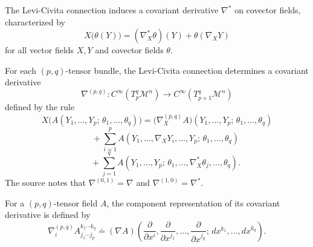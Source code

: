 \begin{definition}
\label{appa-def-covariant-derivative-covector}



The Levi-Civita connection induces a covariant derivative \(\nabla^*\) on covector fields, characterized by
\[
X\bigl(\theta(Y)\bigr) = (\nabla_X^*\theta)(Y) + \theta(\nabla_X Y)
\]
for all vector fields \(X,Y\) and covector fields \(\theta\).
\end{definition}

\begin{definition}
\label{appa-def-covariant-derivative-general-tensor}



For each \((p,q)\)-tensor bundle, the Levi-Civita connection determines a covariant derivative
\[
\nabla^{(p,q)} : C^\infty\!\left(T_p^q \mathcal M^n\right) \to C^\infty\!\left(T_{p+1}^q \mathcal M^n\right)
\]
defined by the rule
\[
X\bigl(A(Y_1,\ldots,Y_p;\,\theta_1,\ldots,\theta_q)\bigr)
= \bigl(\nabla_X^{(p,q)}A\bigr)(Y_1,\ldots,Y_p;\,\theta_1,\ldots,\theta_q)
\]
\[
\qquad + \sum_{i=1}^p A(Y_1,\ldots,\nabla_X Y_i,\ldots,Y_p;\,\theta_1,\ldots,\theta_q)
\]
\[
\qquad + \sum_{j=1}^q A(Y_1,\ldots,Y_p;\,\theta_1,\ldots,\nabla_X^*\theta_j,\ldots,\theta_q).
\]
The source notes that \(\nabla^{(0,1)}=\nabla\) and \(\nabla^{(1,0)}=\nabla^*\).
\end{definition}

\begin{definition}
\label{appa-def-component-representation-covariant-derivative}


For a \((p,q)\)-tensor field \(A\), the component representation of its covariant derivative is defined by
\[
\nabla_i^{(p,q)} A^{k_1\cdots k_q}_{j_1\cdots j_p}
\doteq
(\nabla A)\!\left(\frac{\partial}{\partial x^i}, \frac{\partial}{\partial x^{j_1}}, \ldots, \frac{\partial}{\partial x^{j_p}};\, dx^{k_1}, \ldots, dx^{k_q}\right).
\]
\end{definition}

